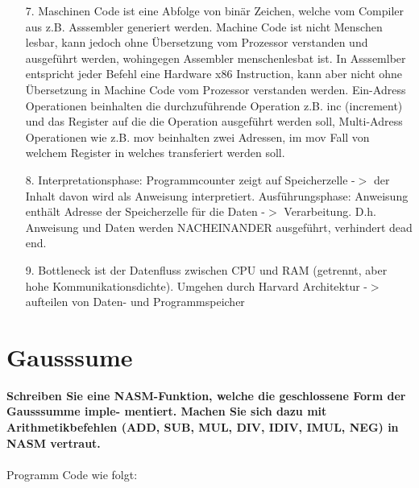 \documentclass[11pt]{article}
\newcommand{\aufgabe}[1]{\item{\bf #1}}
\begin{document}
\begin{enumerate}
\item[7.] Maschinen Code ist eine Abfolge von binär Zeichen, welche vom Compiler aus z.B. Asssembler generiert werden. Machine Code ist nicht Menschen lesbar, kann jedoch ohne Übersetzung vom Prozessor verstanden und ausgeführt werden, wohingegen Assembler menschenlesbat ist. In Asssemlber entspricht jeder Befehl eine Hardware x86 Instruction, kann aber nicht ohne Übersetzung in Machine Code vom Prozessor verstanden werden. Ein-Adress Operationen beinhalten die durchzuführende Operation z.B. inc (increment) und das Register auf die die Operation ausgeführt werden soll, Multi-Adress Operationen wie z.B. mov beinhalten zwei Adressen, im mov Fall von welchem Register in welches transferiert werden soll.
\item[8.] Interpretationsphase: Programmcounter zeigt auf Speicherzelle -$>$ der Inhalt davon wird als Anweisung interpretiert. Ausführungsphase: Anweisung enthält Adresse der Speicherzelle für die Daten -$>$ Verarbeitung. D.h. Anweisung und Daten werden NACHEINANDER ausgeführt, verhindert dead end.
\item[9.] Bottleneck ist der Datenfluss zwischen CPU und RAM (getrennt, aber hohe Kommunikationsdichte). Umgehen durch Harvard Architektur -$>$ aufteilen von Daten- und Programmspeicher
\end{enumerate}
\section{Gausssume}
\aufgabe{Schreiben Sie eine NASM-Funktion, welche die geschlossene Form der Gausssumme imple-
mentiert. Machen Sie sich dazu mit Arithmetikbefehlen (ADD, SUB, MUL, DIV, IDIV, IMUL, NEG) in
NASM vertraut.}
\\
\\
Programm Code wie folgt:

\end{document}
